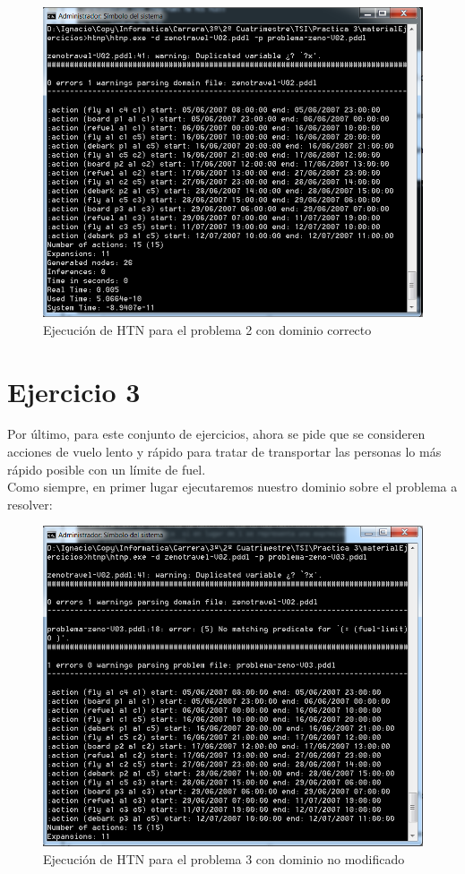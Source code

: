 \begin{figure}[H]
	\centering
	\includegraphics[width=0.8\linewidth]{p22}
	\caption{Ejecución de HTN para el problema 2 con dominio correcto}
	\label{fig:p22}
\end{figure}

\section{Ejercicio 3}
Por último, para este conjunto de ejercicios, ahora se pide que se consideren acciones de vuelo lento y
rápido para tratar de transportar las personas lo más rápido posible con un límite de fuel.\\

Como siempre, en primer lugar ejecutaremos nuestro dominio sobre el problema a resolver:\\

\begin{figure}[H]
	\centering
	\includegraphics[width=0.8\linewidth]{p31}
	\caption{Ejecución de HTN para el problema 3 con dominio no modificado}
	\label{fig:p31}
\end{figure}

